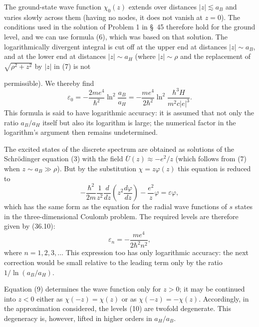The ground-state wave function $\chi_0(z)$ extends over distances $|z|\lesssim a_B$ and varies slowly across them (having no nodes, it does not vanish at $z=0$). The conditions used in the solution of Problem 1 in \S~45 therefore hold for the ground level, and we can use formula (6), which was based on that solution. The logarithmically divergent integral is cut off at the upper end at distances $|z|\sim a_B$, and at the lower end at distances $|z|\sim a_H$ (where $|z|\sim\rho$ and the replacement of $\sqrt{\rho^2+z^2}$ by $|z|$ in (7) is not

permissible). We thereby find
\begin{equation}
 \varepsilon_0=-\frac{2me^4}{\hbar^2}\ln^2\frac{a_B}{a_H}=-\frac{me^4}{2\hbar^2}\ln^2\frac{\hbar^3H}{m^2c|e|^3}.
 \tag{8}
\end{equation}
This formula is said to have logarithmic accuracy: it is assumed that not only the ratio $a_B/a_H$ itself but also its logarithm is large; the numerical factor in the logarithm's argument then remains undetermined.

The excited states of the discrete spectrum are obtained as solutions of the Schrödinger equation (3) with the field $\overline U(z)\approx-e^2/z$ (which follows from (7) when $z\sim a_B\gg\rho$). But by the substitution $\chi=z\varphi(z)$ this equation is reduced to
\begin{equation}
 -\frac{\hbar^2}{2m}\frac1{z^2}\frac d{dz}\left(z^2\frac{d\varphi}{dz}\right)-\frac{e^2}{z}\varphi=\varepsilon\varphi,
 \tag{9}
\end{equation}
which has the same form as the equation for the radial wave functions of $s$ states in the three-dimensional Coulomb problem. The required levels are therefore given by (36.10):
\begin{equation}
 \varepsilon_n=-\frac{me^4}{2\hbar^2n^2},
 \tag{10}
\end{equation}
where $n=1,2,3,\ldots$ This expression too has only logarithmic accuracy: the next correction would be small relative to the leading term only by the ratio $1/\ln(a_B/a_H)$.

Equation (9) determines the wave function only for $z>0$; it may be continued into $z<0$ either as $\chi(-z)=\chi(z)$ or as $\chi(-z)=-\chi(z)$. Accordingly, in the approximation considered, the levels (10) are twofold degenerate. This degeneracy is, however, lifted in higher orders in $a_H/a_B$.
